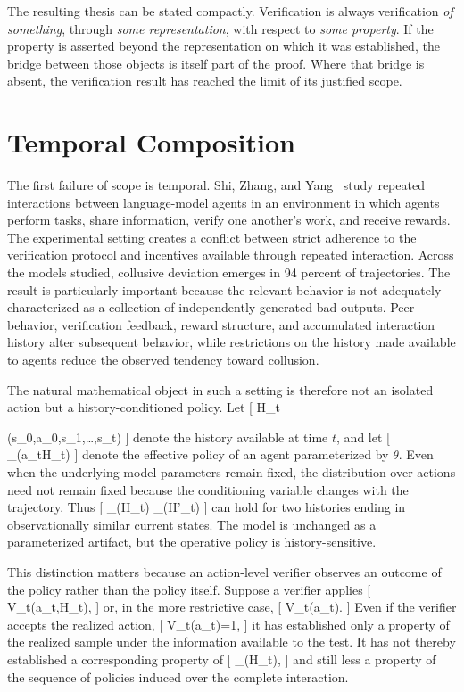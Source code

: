 \documentclass[11pt]{article}
\begin{document}
The resulting thesis can be stated compactly. Verification is always verification \emph{of something}, through \emph{some representation}, with respect to \emph{some property}. If the property is asserted beyond the representation on which it was established, the bridge between those objects is itself part of the proof. Where that bridge is absent, the verification result has reached the limit of its justified scope.

\section{Temporal Composition}

The first failure of scope is temporal. Shi, Zhang, and Yang~\cite{shi2026} study repeated interactions between language-model agents in an environment in which agents perform tasks, share information, verify one another's work, and receive rewards. The experimental setting creates a conflict between strict adherence to the verification protocol and incentives available through repeated interaction. Across the models studied, collusive deviation emerges in 94 percent of trajectories. The result is particularly important because the relevant behavior is not adequately characterized as a collection of independently generated bad outputs. Peer behavior, verification feedback, reward structure, and accumulated interaction history alter subsequent behavior, while restrictions on the history made available to agents reduce the observed tendency toward collusion.

The natural mathematical object in such a setting is therefore not an isolated action but a history-conditioned policy. Let
[
H_{\leq t}

(s_0,a_0,s_1,\ldots,s_t)
]
denote the history available at time $t$, and let
[
\pi_\theta(a_t\mid H_{\leq t})
]
denote the effective policy of an agent parameterized by $\theta$. Even when the underlying model parameters remain fixed, the distribution over actions need not remain fixed because the conditioning variable changes with the trajectory. Thus
[
\pi_\theta(\cdot\mid H_{\leq t})
\neq
\pi_\theta(\cdot\mid H'_{\leq t})
]
can hold for two histories ending in observationally similar current states. The model is unchanged as a parameterized artifact, but the operative policy is history-sensitive.

This distinction matters because an action-level verifier observes an outcome of the policy rather than the policy itself. Suppose a verifier applies
[
V_t(a_t,H_{\leq t}),
]
or, in the more restrictive case,
[
V_t(a_t).
]
Even if the verifier accepts the realized action,
[
V_t(a_t)=1,
]
it has established only a property of the realized sample under the information available to the test. It has not thereby established a corresponding property of
[
\pi_\theta(\cdot\mid H_{\leq t}),
]
and still less a property of the sequence of policies induced over the complete interaction.
\end{document}
